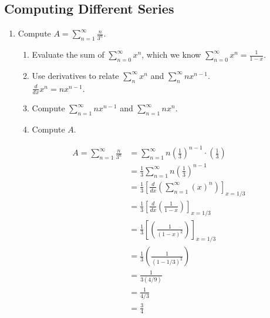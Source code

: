 \documentclass{article}
\begin{document}
\subsection{Computing Different Series}
\begin{enumerate}
    \item Compute $A = \sum_{n=1}^\infty \frac{n}{3^n}$.
    \begin{enumerate}
        \item Evaluate the sum of $\sum_{n=0}^\infty x^n$,
        which we know $\sum_{n=0}^\infty x^n = \frac{1}{1-x}$.
        
        \item Use derivatives to relate $\sum_n^\infty x^n$ and $\sum_n^\infty nx^{n-1}$.\\
        $\frac{d}{dx} x^n = nx^{n-1}$.
        
        \item Compute $\sum_{n=1}^\infty nx^{n-1}$ and $\sum_{n=1}^\infty nx^n$.
        
        \item Compute $A$.
    \end{enumerate}
    \begin{align*}
        A = \sum_{n=1}^\infty \frac{n}{3^n} & = \sum_{n=1}^\infty n(\frac{1}{3})^{n-1} \cdot (\frac{1}{3})\\
        & = \frac{1}{3} \sum_{n=1}^\infty n(\frac{1}{3})^{n-1}\\
        & = \frac{1}{3}\left[ \frac{d}{dx}(\sum_{n=1}^\infty (x)^n ) \right]_{x=1/3}\\
        & = \frac{1}{3} \left[ \frac{d}{dx} \left(\frac{1}{1-x}\right)\right]_{x = 1/3}\\
        & = \frac{1}{3}\left[\left(\frac{1}{(1-x)^2}\right)\right]_{x=1/3}\\
        & = \frac{1}{3}\left( \frac{1}{(1-1/3)^2}\right)\\
        & = \frac{1}{3(4/9)}\\
        & = \frac{1}{4/3}\\
        & = \frac{3}{4}
    \end{align*}
    

\end{enumerate}
\end{document}
